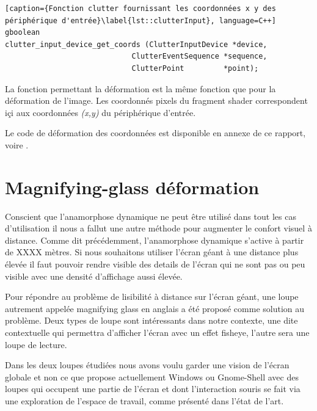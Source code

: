 \begin{lstlisting}[caption={Fonction clutter fournissant les coordonnées x y des périphérique d'entrée}\label{lst::clutterInput}, language=C++]
gboolean
clutter_input_device_get_coords (ClutterInputDevice *device,
						     ClutterEventSequence *sequence, 
						     ClutterPoint         *point);
\end{lstlisting}

La fonction permettant la déformation est la même fonction que pour la déformation de l'image. Les coordonnés pixels du fragment shader correspondent içi aux coordonnées \textit{(x,y)} du périphérique d'entrée. 

Le code de déformation des coordonnées est disponible en annexe de ce rapport, voire .




























\section{Magnifying-glass déformation}

Conscient que l'anamorphose dynamique ne peut être utilisé dans tout les cas d'utilisation il nous a fallut une autre méthode pour augmenter le confort visuel à distance. Comme dit précédemment, l'anamorphose dynamique s'active à partir de XXXX mètres. Si nous souhaitons utiliser l'écran géant à une distance plus élevée il faut pouvoir rendre visible des details de l'écran qui ne sont pas ou peu visible avec une densité d'affichage aussi élevée.

Pour répondre au problème de lisibilité à distance sur l'écran géant, une loupe autrement appelée magnifying glass en anglais a été proposé comme solution au problème. Deux types de loupe sont intéressants dans notre contexte, une dite contextuelle qui permettra d'afficher l'écran avec un effet fisheye, l'autre sera une loupe de lecture.

Dans les deux loupes étudiées nous avons voulu garder une vision de l'écran globale et non ce que propose actuellement Windows ou Gnome-Shell avec des loupes qui occupent une partie de l'écran et dont l'interaction souris se fait via une exploration de l'espace de travail, comme présenté dans l'état de l'art. 


